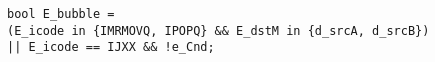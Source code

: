 \documentclass{article}
\begin{document}
\texttt{bool E\_bubble = \\
\hspace*{17mm} (E\_icode in \{IMRMOVQ, IPOPQ\} \&\& E\_dstM in \{d\_srcA, d\_srcB\}) \\
\hspace*{17mm} || E\_icode == IJXX \&\& !e\_Cnd;
}
\end{document}
